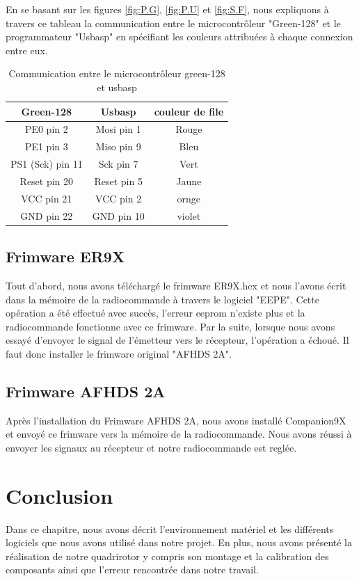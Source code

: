 	
	
	En se basant sur les figures \ref{fig:P.G}, \ref{fig:P.U} et \ref{fig:S.F}, nous expliquons à travers ce tableau la communication entre le microcontrôleur "Green-128" et le programmateur "Usbasp" en spécifiant les couleurs attribuées à chaque connexion entre eux.
	
	\begin{table}[H]
		\begin{center}
			\caption{Communication entre le microcontrôleur green-128 et usbasp }
			\begin{tabular}{|c|c|c|}
				\hline
				\centering
				Green-128 &	Usbasp & couleur de file \\
				\hline
				PE0 pin 2 & Mosi pin 1 & Rouge  \\
				\hline
				PE1 pin 3 & Miso pin 9 & Bleu  \\
				\hline
				PS1 (Sck)  pin 11 & Sck pin 7 & Vert  \\
				\hline
				Reset pin 20 & Reset pin 5 & Jaune \\
				\hline
				VCC pin 21 & VCC pin 2 &  ornge \\
				\hline
				GND pin 22 & GND pin 10 & violet \\
				\hline
			\end{tabular}
		\end{center}
	\end{table}
	\subsection{Frimware ER9X}
	Tout d'abord, nous avons téléchargé le frimware ER9X.hex et nous l'avons écrit dans la mémoire de la radiocommande à travers le logiciel "EEPE". Cette opération a été effectué avec succès, l'erreur eeprom n'existe plus et la radiocommande fonctionne avec ce frimware. Par la suite, lorsque nous avons essayé d'envoyer le signal de l'émetteur vers le récepteur, l'opération a échoué. Il faut donc installer le frimware original "AFHDS 2A".
	\subsection{Frimware AFHDS 2A}
	Après l'installation du Frimware AFHDS 2A, nous avons installé Companion9X et envoyé ce frimware vers la mémoire de la radiocommande. Nous avons réussi à envoyer les signaux au récepteur et notre radiocommande est reglée.
	
	
 
	\section*{Conclusion}
	Dans ce chapitre, nous avons décrit l'environnement matériel et les différents logiciels que nous avons utilisé dans notre projet. En plus, nous avons présenté la réalisation de notre quadrirotor y compris son montage et la calibration des composants ainsi que l'erreur rencontrée dans notre travail.


